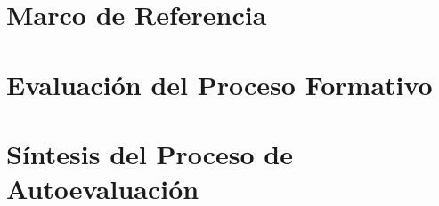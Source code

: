 \documentclass[11pt,fleqn]{book} %
\begin{document}

\chapter{Marco de Referencia}





\chapter{Evaluación del Proceso Formativo}





\chapter{Síntesis del Proceso de Autoevaluación}





% 
\end{document}
